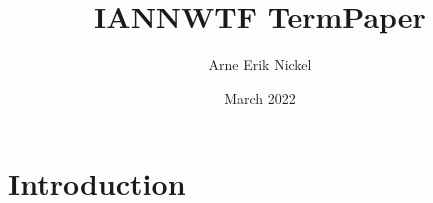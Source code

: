 \documentclass{article}
\title{IANNWTF TermPaper}
\author{Arne Erik Nickel}
\date{March 2022}
\begin{document}
\maketitle

\section{Introduction}
\end{document}
